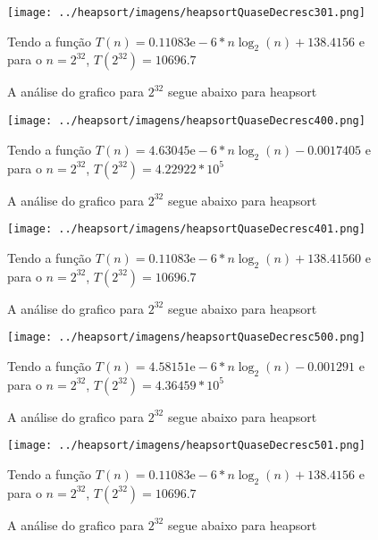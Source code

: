 \documentclass[12pt,a4paper,twoside]{report}
\begin{document}
\begin{figure}[ht]
\centering \texttt{[image: ../heapsort/imagens/heapsortQuaseDecresc301.png]}
\caption{A análise do grafico para $2^{32}$ segue abaixo para heapsort}

Tendo a função $T(n) = 0.11083\mathrm{e}-6*n\log_{2}(n)+138.4156$ e para o $n =2^{32}$, $T(2^{32}) = 10696.7$
\label{fig:heapsortQuaseDecresc301}
\end{figure}




\begin{figure}[ht]
\centering \texttt{[image: ../heapsort/imagens/heapsortQuaseDecresc400.png]}
\caption{A análise do grafico para $2^{32}$ segue abaixo para heapsort}

Tendo a função $T(n) = 4.63045\mathrm{e}-6*n\log_{2}(n)-0.0017405$ e para o $n =2^{32}$, $T(2^{32}) = 4.22922*10^{5}$
\label{fig:heapsortQuaseDecresc400}
\end{figure}

\begin{figure}[ht]
\centering \texttt{[image: ../heapsort/imagens/heapsortQuaseDecresc401.png]}
\caption{A análise do grafico para $2^{32}$ segue abaixo para heapsort}

Tendo a função $T(n) = 0.11083\mathrm{e}-6*n\log_{2}(n)+138.41560$ e para o $n =2^{32}$, $T(2^{32}) = 10696.7$
\label{fig:heapsortQuaseDecresc401}
\end{figure}




\begin{figure}[ht]
\centering \texttt{[image: ../heapsort/imagens/heapsortQuaseDecresc500.png]}
\caption{A análise do grafico para $2^{32}$ segue abaixo para heapsort}

Tendo a função $T(n) = 4.58151\mathrm{e}-6*n\log_{2}(n)-0.001291$ e para o $n =2^{32}$, $T(2^{32}) = 4.36459*10^{5}$
\label{fig:heapsortQuaseDecresc500}
\end{figure}

\begin{figure}[ht]
\centering \texttt{[image: ../heapsort/imagens/heapsortQuaseDecresc501.png]}
\caption{A análise do grafico para $2^{32}$ segue abaixo para heapsort}

Tendo a função $T(n) = 0.11083\mathrm{e}-6*n\log_{2}(n)+138.4156$ e para o $n =2^{32}$, $T(2^{32}) = 10696.7$
\label{fig:heapsortQuaseDecresc501}
\end{figure}
\end{document}
